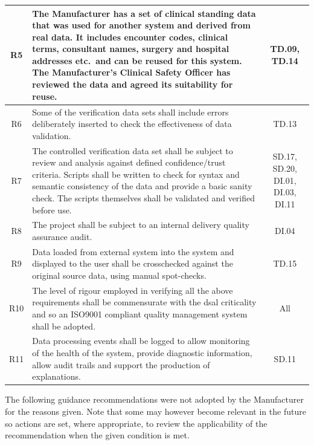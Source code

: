 \begin{longtable}{|C{}|L{}|C{}|}
  \hline
  R5 & The Manufacturer has a set of clinical standing data that was used for another system and derived from real data.
  It includes encounter codes, clinical terms, consultant names, surgery and hospital addresses etc.\ and can be reused for this system. The Manufacturer's Clinical Safety Officer has reviewed the data and agreed its suitability for reuse. & TD.09, TD.14\\
  \hline
  R6 & Some of the verification data sets shall include errors deliberately inserted to check the effectiveness of data validation. & TD.13\\
  \hline
  R7 & The controlled verification data set shall be subject to review and analysis against defined confidence/trust criteria. Scripts shall be written to check for syntax and semantic consistency of the data and provide a basic sanity check. The scripts themselves shall be validated and verified before use. & SD.17, SD.20, DI.01, DI.03, DI.11\\
  \hline
  R8 & The project shall be subject to an internal delivery quality assurance audit. & DI.04\\
  \hline
  R9 & Data loaded from external system into the system and displayed to the user shall be crosschecked against the original source data, using manual spot-checks. & TD.15\\
  \hline
  R10 & The level of rigour employed in verifying all the above requirements shall be commensurate with the \gls{dsal} criticality and so an ISO9001 compliant quality management system shall be adopted. & All\\
  \hline
  R11 & Data processing events shall be logged to allow monitoring of the health of the system, provide diagnostic information, allow audit trails and support the production of explanations. & SD.11
  \\
  \hline
\end{longtable}

The following guidance recommendations were not adopted by the Manufacturer for the reasons given. Note that some may however become relevant in the future so actions are set, where appropriate, to review the applicability of the recommendation when the given condition is met.

